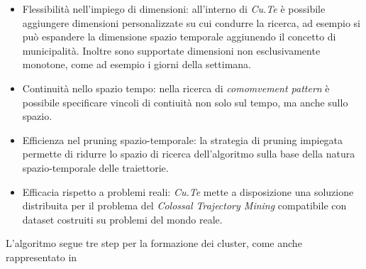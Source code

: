 \begin{itemize}

  \item Flessibilità nell'impiego di dimensioni: all'interno di \textit{Cu.Te} è possibile aggiungere
  dimensioni personalizzate su cui condurre la ricerca, ad esempio si può espandere la dimensione spazio
  temporale aggiunendo il concetto di municipalità.
  Inoltre sono supportate dimensioni non esclusivamente monotone, come ad esempio i giorni della settimana.

  \item Continuità nello spazio tempo: nella ricerca di \textit{comomvement pattern} è possibile specificare vincoli di contiuità non solo sul tempo, ma anche sullo spazio.

  \item Efficienza nel pruning spazio-temporale: la strategia di pruning impiegata permette di ridurre
  lo spazio di ricerca dell'algoritmo sulla base della natura spazio-temporale delle traiettorie.

  \item Efficacia rispetto a problemi reali: \textit{Cu.Te} mette a disposizione una soluzione distribuita per il problema del \textit{Colossal Trajectory Mining}
  compatibile con dataset costruiti su problemi del mondo reale.
\end{itemize}


L'algoritmo segue tre step per la formazione dei cluster, come anche rappresentato in



